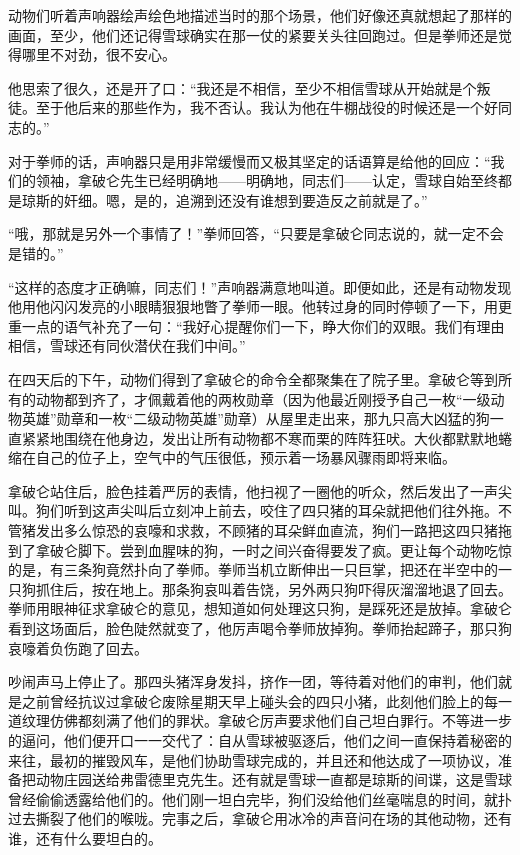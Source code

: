 动物们听着声响器绘声绘色地描述当时的那个场景，他们好像还真就想起了那样的画面，至少，他们还记得雪球确实在那一仗的紧要关头往回跑过。但是拳师还是觉得哪里不对劲，很不安心。

他思索了很久，还是开了口：“我还是不相信，至少不相信雪球从开始就是个叛徒。至于他后来的那些作为，我不否认。我认为他在牛棚战役的时候还是一个好同志的。”

对于拳师的话，声响器只是用非常缓慢而又极其坚定的话语算是给他的回应：“我们的领袖，拿破仑先生已经明确地——明确地，同志们——认定，雪球自始至终都是琼斯的奸细。嗯，是的，追溯到还没有谁想到要造反之前就是了。”

“哦，那就是另外一个事情了！”拳师回答，“只要是拿破仑同志说的，就一定不会是错的。”

“这样的态度才正确嘛，同志们！”声响器满意地叫道。即便如此，还是有动物发现他用他闪闪发亮的小眼睛狠狠地瞥了拳师一眼。他转过身的同时停顿了一下，用更重一点的语气补充了一句：“我好心提醒你们一下，睁大你们的双眼。我们有理由相信，雪球还有同伙潜伏在我们中间。”

在四天后的下午，动物们得到了拿破仑的命令全都聚集在了院子里。拿破仑等到所有的动物都到齐了，才佩戴着他的两枚勋章（因为他最近刚授予自己一枚“一级动物英雄”勋章和一枚“二级动物英雄”勋章）从屋里走出来，那九只高大凶猛的狗一直紧紧地围绕在他身边，发出让所有动物都不寒而栗的阵阵狂吠。大伙都默默地蜷缩在自己的位子上，空气中的气压很低，预示着一场暴风骤雨即将来临。

拿破仑站住后，脸色挂着严厉的表情，他扫视了一圈他的听众，然后发出了一声尖叫。狗们听到这声尖叫后立刻冲上前去，咬住了四只猪的耳朵就把他们往外拖。不管猪发出多么惊恐的哀嚎和求救，不顾猪的耳朵鲜血直流，狗们一路把这四只猪拖到了拿破仑脚下。尝到血腥味的狗，一时之间兴奋得要发了疯。更让每个动物吃惊的是，有三条狗竟然扑向了拳师。拳师当机立断伸出一只巨掌，把还在半空中的一只狗抓住后，按在地上。那条狗哀叫着告饶，另外两只狗吓得灰溜溜地退了回去。拳师用眼神征求拿破仑的意见，想知道如何处理这只狗，是踩死还是放掉。拿破仑看到这场面后，脸色陡然就变了，他厉声喝令拳师放掉狗。拳师抬起蹄子，那只狗哀嚎着负伤跑了回去。

吵闹声马上停止了。那四头猪浑身发抖，挤作一团，等待着对他们的审判，他们就是之前曾经抗议过拿破仑废除星期天早上碰头会的四只小猪，此刻他们脸上的每一道纹理仿佛都刻满了他们的罪状。拿破仑厉声要求他们自己坦白罪行。不等进一步的逼问，他们便开口一一交代了：自从雪球被驱逐后，他们之间一直保持着秘密的来往，最初的摧毁风车，是他们协助雪球完成的，并且还和他达成了一项协议，准备把动物庄园送给弗雷德里克先生。还有就是雪球一直都是琼斯的间谍，这是雪球曾经偷偷透露给他们的。他们刚一坦白完毕，狗们没给他们丝毫喘息的时间，就扑过去撕裂了他们的喉咙。完事之后，拿破仑用冰冷的声音问在场的其他动物，还有谁，还有什么要坦白的。

